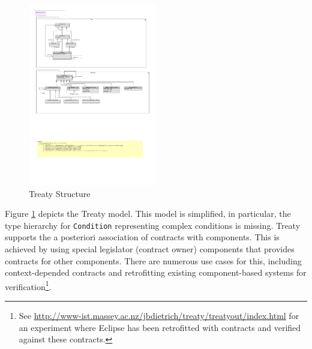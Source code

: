 \documentclass{llncs}
\begin{document}
\begin{figure}[t]
  \centering
  \includegraphics[width=0.5\textwidth]{RoleModel1.pdf}
  \caption{Treaty Structure}
  \label{fig:treatyStructure}
\end{figure}

Figure \ref{fig:treatyStructure} depicts the Treaty model. This model is simplified, in particular, the type hierarchy for \texttt{Condition} representing complex conditions is missing. Treaty supports the a posteriori association of contracts with components. 
This is achieved by using special legislator (contract owner) components that provides contracts for other components.  There are numerous use cases for this, including context-depended contracts and retrofitting existing component-based systems for verification\footnote{See \url{http://www-ist.massey.ac.nz/jbdietrich/treaty/treatyout/index.html} for an experiment where Eclipse has been retrofitted with contracts and verified against these contracts.}.   
 
\end{document}
